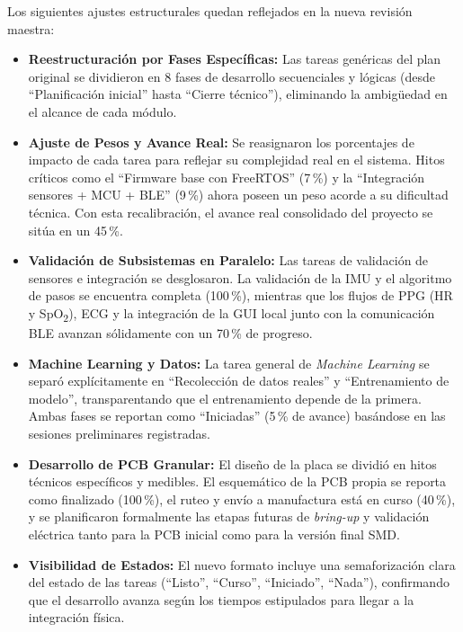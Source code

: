 \documentclass[letterpaper,11pt]{article}
\begin{document}
Los siguientes ajustes estructurales quedan reflejados en la nueva revisión maestra:
\begin{itemize}
    \item \textbf{Reestructuración por Fases Específicas:} Las tareas genéricas del plan original se dividieron en 8 fases de desarrollo secuenciales y lógicas (desde ``Planificación inicial'' hasta ``Cierre técnico''), eliminando la ambigüedad en el alcance de cada módulo.
    
    \item \textbf{Ajuste de Pesos y Avance Real:} Se reasignaron los porcentajes de impacto de cada tarea para reflejar su complejidad real en el sistema. Hitos críticos como el ``Firmware base con FreeRTOS'' (7\,\%) y la ``Integración sensores + MCU + BLE'' (9\,\%) ahora poseen un peso acorde a su dificultad técnica. Con esta recalibración, el avance real consolidado del proyecto se sitúa en un 45\,\%.
    
    \item \textbf{Validación de Subsistemas en Paralelo:} Las tareas de validación de sensores e integración se desglosaron. La validación de la IMU y el algoritmo de pasos se encuentra completa (100\,\%), mientras que los flujos de PPG (HR y SpO\textsubscript{2}), ECG y la integración de la GUI local junto con la comunicación BLE avanzan sólidamente con un 70\,\% de progreso.
    
    \item \textbf{Machine Learning y Datos:} La tarea general de \textit{Machine Learning} se separó explícitamente en ``Recolección de datos reales'' y ``Entrenamiento de modelo'', transparentando que el entrenamiento depende de la primera. Ambas fases se reportan como ``Iniciadas'' (5\,\% de avance) basándose en las sesiones preliminares registradas.
    
    \item \textbf{Desarrollo de PCB Granular:} El diseño de la placa se dividió en hitos técnicos específicos y medibles. El esquemático de la PCB propia se reporta como finalizado (100\,\%), el ruteo y envío a manufactura está en curso (40\,\%), y se planificaron formalmente las etapas futuras de \textit{bring-up} y validación eléctrica tanto para la PCB inicial como para la versión final SMD.
    
    \item \textbf{Visibilidad de Estados:} El nuevo formato incluye una semaforización clara del estado de las tareas (``Listo'', ``Curso'', ``Iniciado'', ``Nada''), confirmando que el desarrollo avanza según los tiempos estipulados para llegar a la integración física.
\end{itemize}
\end{document}
